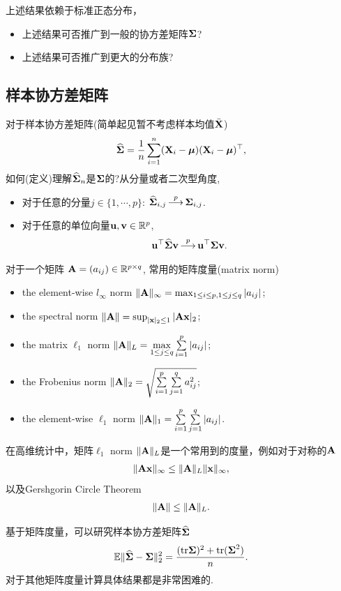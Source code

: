 	\begin{remark}上述结果依赖于标准正态分布，
		\begin{itemize}
			\item 上述结果可否推广到一般的协方差矩阵$\mbox{\boldmath $\Sigma$}$? 
			\item 上述结果可否推广到更大的分布族?
		\end{itemize}
	\end{remark}




\subsection{样本协方差矩阵}
对于样本协方差矩阵(简单起见暂不考虑样本均值$\bar{{\bf X}}$)
\begin{align*}
	\mbox{$\widehat{\mbox{\boldmath $\Sigma$}}$}=\frac{1}{n} \sum_{i=1}^n ({\bf X}_i-\mbox{\boldmath $\mu$})({\bf X}_i-\mbox{\boldmath $\mu$})^\top,
\end{align*}
如何(定义)理解$\mbox{$\widehat{\mbox{\boldmath $\Sigma$}}$}_n$是$\mbox{\boldmath $\Sigma$}$的?从分量或者二次型角度,
\begin{itemize}
	\item 对于任意的分量$j \in \{1,\cdots,p\}$:  $\hSig_{i,j} \topr \bSig_{i,j}$.
	\item 对于任意的单位向量${\bf u},{\bf v} \in \mathbb{R}^p$, 
	\begin{align*}
		\u \trans \hSig \v \topr \u \trans \bSig \v.
	\end{align*}
\end{itemize}

\begin{defin}[矩阵norm]
	对于一个矩阵 ${\bf A}=(a_{ij})\in \mathbb{R}^{p\times q}$, 常用的矩阵度量(matrix norm)
	\begin{itemize}
		\item the element-wise $l_{\infty}$ norm $\|{\bf A}\|_{\infty}=\max_{1\leq i \leq p, 1 \leq j \leq q} |a_{ij}|$;
		\item the spectral norm $\|{\bf A}\|=\sup_{|\mathbf{x}|_2\leq 1}|{\bf A} \mathbf{x}|_2$;
		\item the matrix $\ell_1$ norm $\|{\bf A}\|_{L}=\max\limits_{1\leq j\leq q}\sum\limits_{i=1}^{p}|a_{ij}|$;
		\item the Frobenius norm $\|{\bf A}\|_2=\sqrt{\sum\limits_{i=1}^p\sum \limits_{j=1}^{q}a_{ij}^2}$;
		\item the element-wise $\ell_1$ norm $\|{\bf A}\|_1=\sum\limits_{i=1}^p\sum\limits_{j=1}^{q}|a_{ij}|$.
	\end{itemize}
\end{defin}

\begin{remark}
	在高维统计中，矩阵$\ell_1$ norm $\|{\bf A}\|_{L}$是一个常用到的度量，例如对于对称的${\bf A}$
	\begin{align*}
		\|{\bf A} {\bf x}\|_\infty \leq \|{\bf A}\|_{L} \|{\bf x}\|_{\infty},
	\end{align*}
	以及Gershgorin Circle Theorem
	\begin{align*}
		\|{\bf A}\|\leq \|{\bf A}\|_{L}.
	\end{align*}
\end{remark}
基于矩阵度量，可以研究样本协方差矩阵$\mbox{$\widehat{\mbox{\boldmath $\Sigma$}}$}$
\begin{align*}
	\mathbb{E} \|\mbox{$\widehat{\mbox{\boldmath $\Sigma$}}$}-\mbox{\boldmath $\Sigma$}\|_2^2=\frac{(\mbox{tr} \mbox{\boldmath $\Sigma$})^2+\mbox{tr}(\mbox{\boldmath $\Sigma$}^2)}{n}.
\end{align*}
对于其他矩阵度量计算具体结果都是非常困难的.

